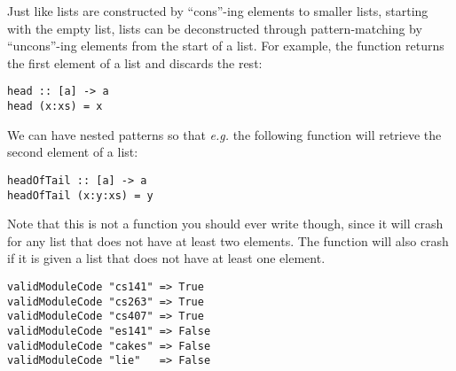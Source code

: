 Just like lists are constructed by ``cons''-ing elements to smaller lists, starting with the empty list, lists can be deconstructed through pattern-matching by ``uncons''-ing elements from the start of a list. For example, the  function returns the first element of a list and discards the rest:
\begin{verbatim}
head :: [a] -> a 
head (x:xs) = x
\end{verbatim}
We can have nested patterns so that \emph{e.g.} the following function will retrieve the second element of a list:
\begin{verbatim}
headOfTail :: [a] -> a 
headOfTail (x:y:xs) = y
\end{verbatim}
Note that this is not a function you should ever write though, since it will crash for any list that does not have at least two elements. The  function will also crash if it is given a list that does not have at least one element.

\begin{verbatim}
validModuleCode "cs141" => True 
validModuleCode "cs263" => True
validModuleCode "cs407" => True
validModuleCode "es141" => False
validModuleCode "cakes" => False
validModuleCode "lie"   => False
\end{verbatim}
